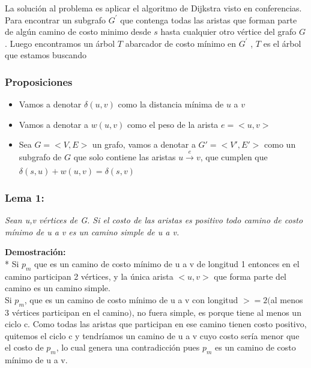 \documentclass{article}
\begin{document}
    \noindent La soluci\'on al problema es aplicar el algoritmo de  Dijkstra visto en conferencias.
    Para encontrar un subgrafo $G^{'}$ que contenga todas las aristas que forman parte de alg\'un camino de 
    costo minimo desde $s$ hasta cualquier otro v\'ertice del grafo $G$. Luego encontramos un \'arbol $T$ abarcador de 
    costo m\'inimo en $G^{'}$ , $T$ es el \'arbol que estamos buscando 


    
    \subsubsection{Proposiciones }
    \begin{itemize}
        \item Vamos a denotar $\delta\left(u,v\right)$ como la distancia m\'inima de $u$ a $v$ 
        \item Vamos a denotar a $w(u,v)$ como el peso de la arista $e= <u,v>$ 
        \item Sea $G = <V,E>$ un grafo, vamos a denotar a $G' = <V',E'>$ como un subgrafo de $G$ que solo contiene las aristas $ u \xrightarrow[]{e} v$, 
        que cumplen que $\delta\left(s,u\right) + w \left(u,v\right) = \delta\left(s,v\right)$   
    \end{itemize}

    \subsubsection{Lema 1:}

    \textit{Sean u,v v\'ertices de G. Si el costo de las aristas es positivo todo camino de costo m\'inimo de u a v es un camino simple de u a v.}
    
    \vspace*{0.3cm} 

    
    \noindent \textbf{Demostraci\'on:}
    \\*
    Si $p_{m}$ que es un camino de costo m\'inimo de u a v de longitud 1 entonces en el camino participan 2 v\'ertices, y la \'unica arista $<u,v>$
    que forma parte del camino es un camino simple.\\ 
    Si $p_{m}$, que es un camino de costo m\'inimo de u a v con longitud $>=2$$($al menos 3 v\'ertices participan en el camino$)$, no fuera simple, es 
    porque tiene al menos un ciclo c. Como todas las aristas que participan en ese camino tienen costo positivo, quitemos el ciclo c y tendr\'iamos 
    un camino de u a v cuyo costo ser\'ia menor que el costo de $p_{m}$, lo cual genera
    una contradicci\'on pues $p_{m}$ es un camino de costo m\'inimo de u a v.\\
    
\end{document}
